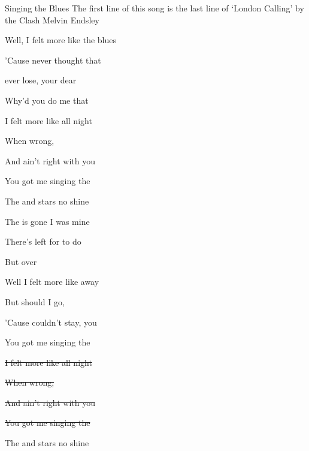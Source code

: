 \begin{SBSong}{Singing the Blues}
  {The first line of this song is the last line of `London Calling' by the Clash}
  {Melvin Endsley}
  \begin{SBVerse}
	Well, I  felt more like  the blues
	
	'Cause  never thought that
	
	 ever lose, your  dear
	
	 Why'd you do me that    
  \end{SBVerse}
  \begin{SBVerse}
	I  felt more like  all night
	
	When  wrong,
	
	And  ain't right with you
	
	 You got me singing the    
  \end{SBVerse}
  \begin{SBVerse}
	The  and stars no  shine
	
	The  is gone I  was mine
	
	There's  left for  to do
	
	But  over 
  \end{SBVerse}
  \begin{SBVerse}
	Well I  felt more like  away
	
	But  should I go,
	
	'Cause  couldn't stay,  you
	
	 You got me singing the    
  \end{SBVerse}
  \begin{SBVerse}
	
	\sout{I  felt more like  all night}
	
	\sout{When  wrong,}
	
	\sout{And  ain't right with you}
	
	\sout{You got me singing the }   
  \end{SBVerse}
  \CBPageBrk
  \begin{SBVerse}
	The  and stars no  shine
	

\end{SBVerse}
\end{SBSong}
